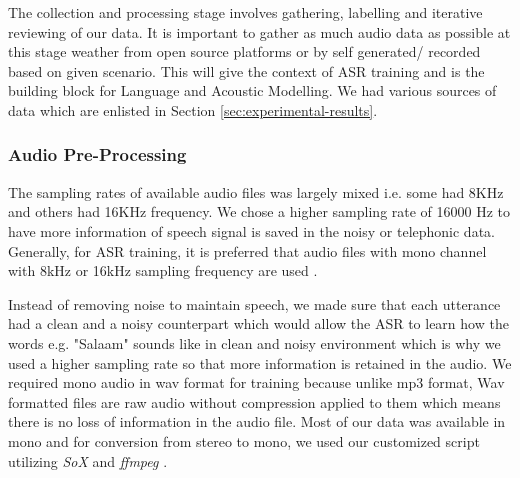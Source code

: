 \documentclass[a4paper, 11pt]{article}
\begin{document}

The collection and processing stage involves gathering, labelling and iterative reviewing of our data. It is important to gather as much audio data as possible at this stage weather from open source platforms or by self generated/ recorded based on given scenario. This will give the context of ASR training and is the building block for Language and Acoustic Modelling. We had various sources of data which are enlisted in Section \ref{sec:experimental-results}.

\subsubsection{Audio Pre-Processing}

The sampling rates of available audio files was largely mixed i.e. some had 8KHz and others had 16KHz frequency. We chose a higher sampling rate of 16000 Hz to have more information of speech signal is saved in the noisy or telephonic data. Generally, for ASR training, it is preferred \cite{noauthor_kaldi_nodate} that audio files with mono channel with 8kHz or 16kHz sampling frequency are used \cite{noauthor_why_nodate}. 

Instead of removing noise to maintain speech, we made sure that each utterance had a clean and a noisy counterpart which would allow the ASR to learn how the words e.g. "Salaam" sounds like in clean and noisy environment which is why we used a higher sampling rate so that more information is retained in the audio. We required mono audio in wav format for training \cite{noauthor_kaldi_nodate} \cite{noauthor_why_nodate} because unlike mp3 format, Wav formatted files are raw audio without compression applied to them which means there is no loss of information in the audio file. Most of our data was available in mono and for conversion from stereo to mono, we used our customized script utilizing \textit{SoX} and \textit{ffmpeg} \cite{noauthor_sox_nodate}. 

\end{document}
